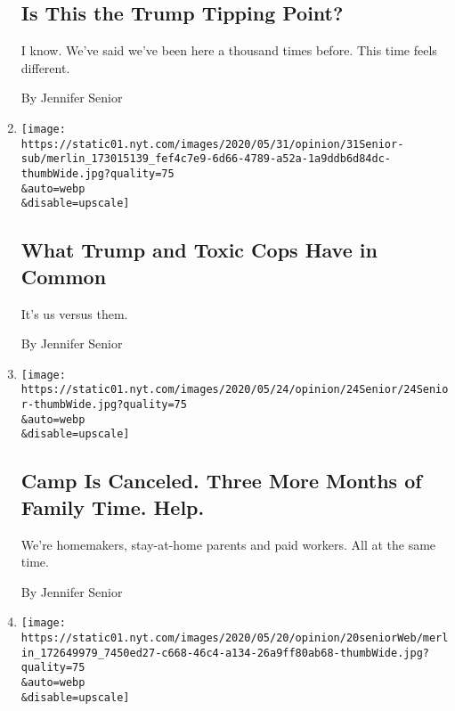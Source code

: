 \begin{enumerate}
  \hypertarget{is-this-the-trump-tipping-point}{%
  \subsection{Is This the Trump Tipping
  Point?}\label{is-this-the-trump-tipping-point}}

  I know. We've said we've been here a thousand times before. This time
  feels different.

  By Jennifer Senior
\item
  \href{/2020/05/31/opinion/trump-police-george-floyd.html}{}

  \texttt{[image: https://static01.nyt.com/images/2020/05/31/opinion/31Senior-sub/merlin\_173015139\_fef4c7e9-6d66-4789-a52a-1a9ddb6d84dc-thumbWide.jpg?quality=75\\\&auto=webp\\\&disable=upscale]}

  \hypertarget{what-trump-and-toxic-cops-have-in-common}{%
  \subsection{What Trump and Toxic Cops Have in
  Common}\label{what-trump-and-toxic-cops-have-in-common}}

  It's us versus them.

  By Jennifer Senior
\item
  \href{/2020/05/24/opinion/coronavirus-parents-work-from-home.html}{}

  \texttt{[image: https://static01.nyt.com/images/2020/05/24/opinion/24Senior/24Senior-thumbWide.jpg?quality=75\\\&auto=webp\\\&disable=upscale]}

  \hypertarget{camp-is-canceled-three-more-months-of-family-time-help}{%
  \subsection{Camp Is Canceled. Three More Months of Family Time.
  Help.}\label{camp-is-canceled-three-more-months-of-family-time-help}}

  We're homemakers, stay-at-home parents and paid workers. All at the
  same time.

  By Jennifer Senior
\item
  \href{/2020/05/20/opinion/trump-hydroxychloroquine-vaccine.html}{}

  \texttt{[image: https://static01.nyt.com/images/2020/05/20/opinion/20seniorWeb/merlin\_172649979\_7450ed27-c668-46c4-a134-26a9ff80ab68-thumbWide.jpg?quality=75\\\&auto=webp\\\&disable=upscale]}


\end{enumerate}
